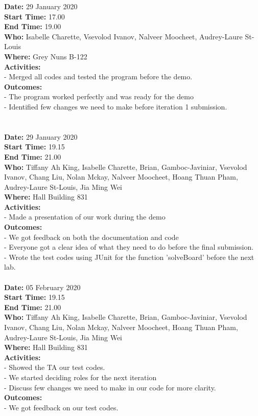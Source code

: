 \documentclass[12pt]{article}
\begin{document}
{\bf Date:} 29 January 2020 \\
{\bf Start Time:} 17.00 \\
{\bf End Time:} 19.00 \\
{\bf Who:} Isabelle Charette, Vsevolod Ivanov, Nalveer Moocheet, Audrey-Laure St-Louis \\
{\bf Where:} Grey Nuns B-122 \\
{\bf Activities:}\\
- Merged all codes and tested the program before the demo.\\
{\bf Outcomes:}\\
- The program worked perfectly and was ready for the demo\\
- Identified few changes we need to make before iteration 1 submission.\\
\\
\\
{\bf Date:} 29 January 2020 \\
{\bf Start Time:} 19.15 \\
{\bf End Time:} 21.00 \\
{\bf Who:} Tiffany Ah King, Isabelle Charette, Brian, Gamboc-Javiniar, Vsevolod Ivanov, Chang Liu, Nolan Mckay, Nalveer Moocheet, Hoang Thuan Pham, Audrey-Laure St-Louis, Jia Ming Wei \\
{\bf Where:} Hall Building 831 \\
{\bf Activities:}\\
- Made a presentation of our work during the demo\\
{\bf Outcomes:}\\
- We got feedback on both the documentation and code\\
- Everyone got a clear idea of what they need to do before the final submission.\\
- Wrote the test codes using JUnit for the function 'solveBoard' before the next lab.
\\
\\
{\bf Date:} 05 February 2020 \\
{\bf Start Time:} 19.15 \\
{\bf End Time:} 21.00 \\
{\bf Who:} Tiffany Ah King, Isabelle Charette, Brian, Gamboc-Javiniar, Vsevolod Ivanov, Chang Liu, Nolan Mckay, Nalveer Moocheet, Hoang Thuan Pham, Audrey-Laure St-Louis, Jia Ming Wei \\
{\bf Where:} Hall Building 831 \\
{\bf Activities:}\\
- Showed the TA our test codes.\\
- We started deciding roles for the next iteration\\
- Discuss few changes we need to make in our code
for more clarity.\\
{\bf Outcomes:}\\
- We got feedback on our test codes.
\end{document}
